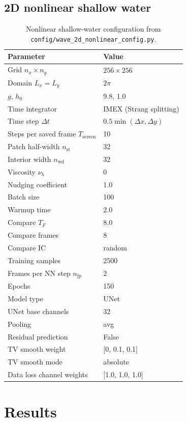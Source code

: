 ﻿\documentclass[11pt,a4paper]{article}
\begin{document}
\subsection{2D nonlinear shallow water}
\begin{table}[H]
  \centering
  \caption{Nonlinear shallow-water configuration from \texttt{config/wave\_2d\_nonlinear\_config.py}.}
  \begin{tabular}{ll}
    \toprule
    Parameter & Value \\
    \midrule
    Grid $n_x\times n_y$ & $256\times256$ \\
    Domain $L_x=L_y$ & $2\pi$ \\
    $g$, $h_0$ & 9.8, 1.0 \\
    Time integrator & IMEX (Strang splitting) \\
    Time step $\Delta t$ & $0.5\min(\Delta x,\Delta y)$ \\
    Steps per saved frame $T_{\mathrm{screen}}$ & 10 \\
    Patch half-width $n_{\mathrm{st}}$ & 32 \\
    Interior width $n_{\mathrm{wd}}$ & 32 \\
    Viscosity $\nu_h$ & 0 \\
    Nudging coefficient & 1.0 \\
    Batch size & 100 \\
    Warmup time & 2.0 \\
    Compare $T_F$ & 8.0 \\
    Compare frames & 8 \\
    Compare IC & random \\
    Training samples & 2500 \\
    Frames per NN step $n_{\mathrm{jp}}$ & 2 \\
    Epochs & 150 \\
    Model type & UNet \\
    UNet base channels & 32 \\
    Pooling & avg \\
    Residual prediction & False \\
    TV smooth weight & [0, 0.1, 0.1] \\
    TV smooth mode & absolute \\
    Data loss channel weights & [1.0, 1.0, 1.0] \\
    \bottomrule
  \end{tabular}
\end{table}

\section{Results}
\end{document}
